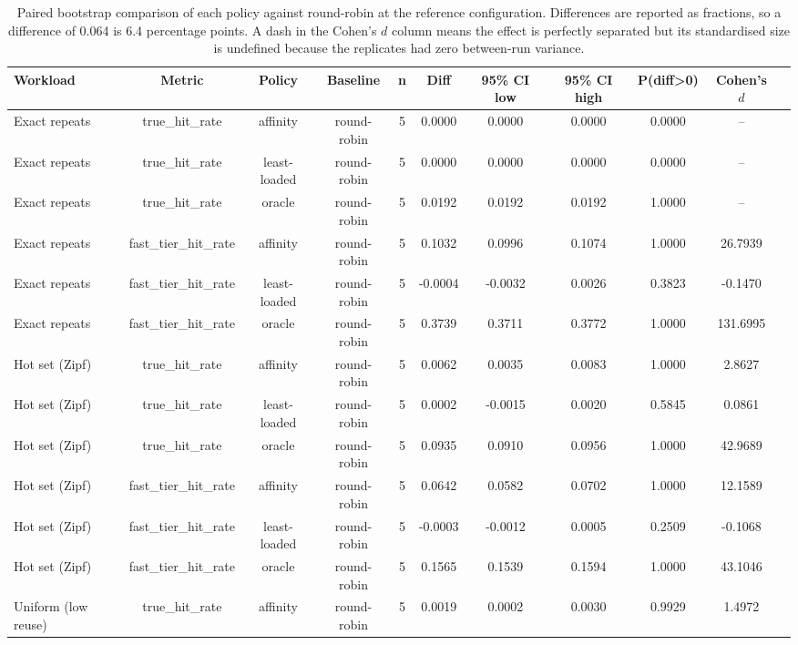 \begin{table}[t]
\centering
\scriptsize
\setlength{\tabcolsep}{2.5pt}
\caption{Paired bootstrap comparison of each policy against round-robin at the reference configuration. Differences are reported as fractions, so a difference of 0.064 is 6.4 percentage points. A dash in the Cohen's $d$ column means the effect is perfectly separated but its standardised size is undefined because the replicates had zero between-run variance.}
\label{tab:significance}
\begin{tabular}{lcccccccccc}
\toprule
Workload & Metric & Policy & Baseline & n & Diff & 95\% CI low & 95\% CI high & P(diff>0) & Cohen's $d$ \\
\midrule
Exact repeats & true\_hit\_rate & affinity & round-robin & 5 & 0.0000 & 0.0000 & 0.0000 & 0.0000 & -- \\
Exact repeats & true\_hit\_rate & least-loaded & round-robin & 5 & 0.0000 & 0.0000 & 0.0000 & 0.0000 & -- \\
Exact repeats & true\_hit\_rate & oracle & round-robin & 5 & 0.0192 & 0.0192 & 0.0192 & 1.0000 & -- \\
Exact repeats & fast\_tier\_hit\_rate & affinity & round-robin & 5 & 0.1032 & 0.0996 & 0.1074 & 1.0000 & 26.7939 \\
Exact repeats & fast\_tier\_hit\_rate & least-loaded & round-robin & 5 & -0.0004 & -0.0032 & 0.0026 & 0.3823 & -0.1470 \\
Exact repeats & fast\_tier\_hit\_rate & oracle & round-robin & 5 & 0.3739 & 0.3711 & 0.3772 & 1.0000 & 131.6995 \\
Hot set (Zipf) & true\_hit\_rate & affinity & round-robin & 5 & 0.0062 & 0.0035 & 0.0083 & 1.0000 & 2.8627 \\
Hot set (Zipf) & true\_hit\_rate & least-loaded & round-robin & 5 & 0.0002 & -0.0015 & 0.0020 & 0.5845 & 0.0861 \\
Hot set (Zipf) & true\_hit\_rate & oracle & round-robin & 5 & 0.0935 & 0.0910 & 0.0956 & 1.0000 & 42.9689 \\
Hot set (Zipf) & fast\_tier\_hit\_rate & affinity & round-robin & 5 & 0.0642 & 0.0582 & 0.0702 & 1.0000 & 12.1589 \\
Hot set (Zipf) & fast\_tier\_hit\_rate & least-loaded & round-robin & 5 & -0.0003 & -0.0012 & 0.0005 & 0.2509 & -0.1068 \\
Hot set (Zipf) & fast\_tier\_hit\_rate & oracle & round-robin & 5 & 0.1565 & 0.1539 & 0.1594 & 1.0000 & 43.1046 \\
Uniform (low reuse) & true\_hit\_rate & affinity & round-robin & 5 & 0.0019 & 0.0002 & 0.0030 & 0.9929 & 1.4972 \\

\end{tabular}
\end{table}
